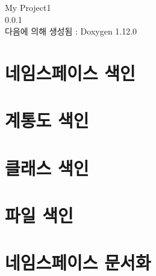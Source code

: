 \documentclass[twoside]{book}
\newcommand{\+}{\discretionary{\mbox{\scriptsize$\hookleftarrow$}}{}{}}
\newcommand{\clearemptydoublepage}{%
    \newpage{\pagestyle{empty}\cleardoublepage}%
  }
\begin{document}
  \raggedbottom
    \hypersetup{pageanchor=false,
                bookmarksnumbered=true,
                pdfencoding=unicode
               }
  \begin{titlepage}
  \vspace*{7cm}
  \begin{center}%
  {\Large My Project1}\\
  [1ex]\large 0.\+0.\+1 \\
  \vspace*{1cm}
  {\large 다음에 의해 생성됨 \+:  Doxygen 1.12.0}\\
  \end{center}
  \end{titlepage}
  \clearemptydoublepage
  \tableofcontents
  \clearemptydoublepage
  \hypersetup{pageanchor=true}
\chapter{네임스페이스 색인}

\chapter{계통도 색인}

\chapter{클래스 색인}

\chapter{파일 색인}

\chapter{네임스페이스 문서화}





\end{document}

